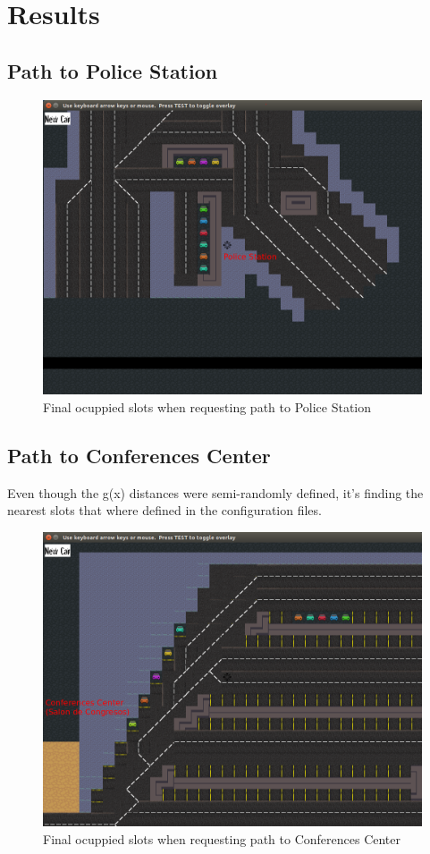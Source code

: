 \chapter{Results}

\section{Path to Police Station}
\begin{figure}[H]
    \centering
    \includegraphics[width=1\textwidth]{images/path_to_police_station.png}
    \caption{Final ocuppied slots when requesting path to Police Station}
    \label{fig:path_to_police_station}
\end{figure}

\section{Path to Conferences Center}
Even though the g(x) distances were semi-randomly defined, it's finding the nearest slots that where defined in the configuration files.
\begin{figure}[H]
    \centering
    \includegraphics[width=.6\textwidth]{images/path_to_conferences_center.png}
    \caption{Final ocuppied slots when requesting path to Conferences Center}
    \label{fig:path_to_conferences_center}
\end{figure}
